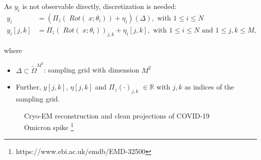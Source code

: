


As $y_i$ is not observable directly, discretization is needed:
\begin{equation}
    \label{eq:cryoEmSimpleDiscrete}
    \begin{aligned}
        y_i &= \left( \Pi_z (\; Rot (\;x; \theta_i)) + \eta_i\right)(\Delta), \text{ with } 1 \leq i \leq N \\
        y_i[j,k] &= \Pi_z (\; Rot(\;x; \theta_i))_{j,k} + \eta_i[j,k], \text{ with } 1 \leq i \leq N \text{ and } 1 \leq j,k \leq M,
    \end{aligned}
\end{equation}

where 
\begin{itemize}
    \item $\Delta \subset \tilde{\Omega}^{M^2}$: sampling grid with dimension $M^2$
    \item Further, $y[j,k]$, $\eta[j,k]$ and $\Pi_z(\cdot)_{j,k}$ $ \in \mathbb{R}$ with $j,k$ as indices of the sampling grid.
\end{itemize}


\begin{figure}[H]
    \label{fig:cryo-em-omicron}
    \hfill
    \hfill
    \hfill
    \hfill
    \hfill
	\caption{Cryo-EM reconstruction and clean projections of COVID-19 Omicron spike \protect\footnote{https://www.ebi.ac.uk/emdb/EMD-32500}}
\end{figure}


